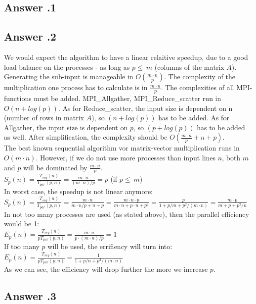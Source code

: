 \documentclass[a4paper,%
11pt,%
DIV=12,
headsepline,%
headings=normal,
]{scrartcl}
\newcounter{curex}
\newcommand{\answer}[1]{\subsection*{Answer \arabic{curex}.#1}}
\begin{document}
\answer{1}

\answer{2}
We would expect the algorithm to have a linear relaitive speedup, due to a good load balance on the processes - as long as $p \leq\ m$  (columns of the matrix $A$). Generating the sub-input is manageable in $O(\frac{m \cdot n}{p})$. The complexity of the multiplication one process has to calculate is in $\frac{m \cdot n}{p}$. The complexities of all MPI-functions must be added. MPI\_Allgather,  MPI\_Reduce\_scatter run in $O(n + log(p))$. As for Reduce\_scatter, the input size is dependent on n (number of rows in matrix $A$), so $(n + log(p))$ has to be added. As for Allgather, the input size is dependent on $p$, so $(p + log(p))$ has to be added as well. After simplification, the complexity should be $O(\frac{m \cdot n}{p} + n + p)$.\\
\newpage
\noindent The best known sequential algorithm vor matrix-vector multiplication runs in $O(m \cdot n)$. However, if we do not use more processes than input lines $n$, both $m$ and $p$ will be dominated by $\frac{m \cdot n}{p}$.\\
\begin{math}S_{p}(n)=\frac{T_{seq}(n)}{T_{par}(p,n)} = \frac{m \cdot n}{(m \cdot n)/p } = p \end{math} (if $p \leq\ m$)\\
In worst case, the speedup is not linear anymore:\\
\begin{math}S_{p}(n)=\frac{T_{seq}(n)}{T_{par}(p,n)} = \frac{m \cdot n}{m \cdot n/p + n + p} = \frac{m \cdot n \cdot p}{m \cdot n + p \cdot  n + p^2} = \frac{p}{1 + p/m + p^2/(m \cdot n)} = \frac{m \cdot p}{m + p + p^2/n}\end{math}\\
In not too many processes are used (as stated above), then the parallel efficiency would be 1:\\
\begin{math}E_{p}(n)=\frac{T_{seq}(n)}{pT_{par}(p,n)} = \frac{m \cdot n}{p \cdot (m \cdot n)/p} = 1 \end{math}\\
If too many $p$ will be used, the errifiency will turn into:\\
\begin{math}E_{p}(n)=\frac{T_{seq}(n)}{pT_{par}(p,n)} = \frac{1}{1 + p/n + p^2/(m \cdot n)} \end{math}\\
As we can see, the efficiency will drop further the more we increase $p$.
\answer{3}
\end{document}

